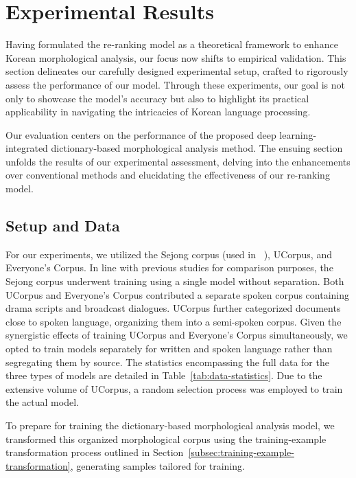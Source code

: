 \documentclass[AMS,STIX2COL]{WileyNJD-v2}
\begin{document}
    \section{Experimental Results}\label{sec:results}

    Having formulated the re-ranking model as a theoretical framework to enhance Korean morphological analysis, our focus now shifts to empirical validation.
    This section delineates our carefully designed experimental setup, crafted to rigorously assess the performance of our model.
    Through these experiments, our goal is not only to showcase the model's accuracy but also to highlight its practical applicability in navigating the intricacies of Korean language processing.

    Our evaluation centers on the performance of the proposed deep learning-integrated dictionary-based morphological analysis method.
    The ensuing section unfolds the results of our experimental assessment, delving into the enhancements over conventional methods and elucidating the effectiveness of our re-ranking model.

    \subsection{Setup and Data}\label{subsec:setup-and-data}

    For our experiments, we utilized the Sejong corpus (used in ~\cite{MinJW2019, MinJW2020, MinJW2022, MinJW2018, NaSH2015, NaSH2014, NaSH2018, SongHJ2019, SongHJ2020}), UCorpus\cite{UCorpusHG}, and Everyone's Corpus\cite{EveryoneCorpus}.
    In line with previous studies for comparison purposes, the Sejong corpus underwent training using a single model without separation.
    Both UCorpus and Everyone's Corpus contributed a separate spoken corpus containing drama scripts and broadcast dialogues.
    UCorpus further categorized documents close to spoken language, organizing them into a semi-spoken corpus.
    Given the synergistic effects of training UCorpus and Everyone's Corpus simultaneously, we opted to train models separately for written and spoken language rather than segregating them by source.
    The statistics encompassing the full data for the three types of models are detailed in Table~\ref{tab:data-statistics}.
    Due to the extensive volume of UCorpus, a random selection process was employed to train the actual model.

    To prepare for training the dictionary-based morphological analysis model, we transformed this organized morphological corpus using the training-example transformation process outlined in Section~\ref{subsec:training-example-transformation}, generating samples tailored for training.
\end{document}
